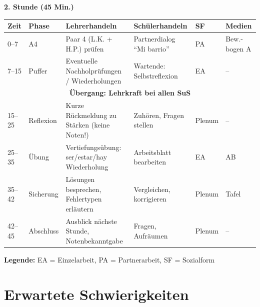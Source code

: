 \documentclass[11pt,a4paper]{article}
\begin{document}
\vspace{1em}

\textbf{2. Stunde (45 Min.)}

\begin{longtable}{|p{1.2cm}|p{1.5cm}|p{4cm}|p{4cm}|p{1.5cm}|p{1.5cm}|}
\hline
\textbf{Zeit} & \textbf{Phase} & \textbf{Lehrerhandeln} & \textbf{Schülerhandeln} & \textbf{SF} & \textbf{Medien} \\
\hline
\endhead

0--7 & A4 & Paar 4 (L.K. + H.P.) prüfen & Partnerdialog ``Mi barrio'' & PA & Bew.-bogen A \\
\hline

7--15 & Puffer & Eventuelle Nachholprüfungen / Wiederholungen & Wartende: Selbstreflexion & EA & -- \\
\hline

\multicolumn{6}{|c|}{\textbf{Übergang: Lehrkraft bei allen SuS}} \\
\hline

15--25 & Reflexion & Kurze Rückmeldung zu Stärken (keine Noten!) & Zuhören, Fragen stellen & Plenum & -- \\
\hline

25--35 & Übung & Vertiefungsübung: ser/estar/hay Wiederholung & Arbeitsblatt bearbeiten & EA & AB \\
\hline

35--42 & Sicherung & Lösungen besprechen, Fehlertypen erläutern & Vergleichen, korrigieren & Plenum & Tafel \\
\hline

42--45 & Abschluss & Ausblick nächste Stunde, Notenbekanntgabe & Fragen, Aufräumen & Plenum & -- \\
\hline
\end{longtable}

\textbf{Legende:} EA = Einzelarbeit, PA = Partnerarbeit, SF = Sozialform

\section{Erwartete Schwierigkeiten}
\end{document}
